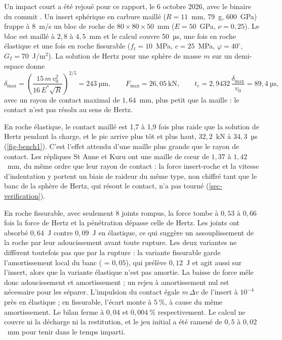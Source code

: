 Un impact court a été rejoué pour ce rapport, le 6 octobre 2026, avec le binaire du commit . Un insert sphérique en carbure maillé ($R = 11$~mm, 79~g, 600~GPa) frappe à 8~m/s un bloc de roche de $80 \times 80 \times 50$~mm ($E = 50$~GPa, $\nu = 0{,}25$). Le bloc est maillé à $2{,}8$ à $4{,}5$~mm et le calcul couvre 50~µs, une fois en roche élastique et une fois en roche fissurable ($f_t = 10$~MPa, $c = 25$~MPa, $\varphi = 40^\circ$, $G_I = 70$~J/m$^2$). La solution de Hertz pour une sphère de masse $m$ sur un demi-espace donne
\begin{equation}
\delta_\text{max} = \left(\frac{15\,m\,v_0^2}{16\,E^*\sqrt R}\right)^{2/5} = 243~\text{µm}, \qquad F_\text{max} = 26{,}05~\text{kN}, \qquad t_c = 2{,}9432\,\frac{\delta_\text{max}}{v_0} = 89{,}4~\text{µs},
\end{equation}
avec un rayon de contact maximal de $1{,}64$~mm, plus petit que la maille : le contact n'est pas résolu au sens de Hertz.

En roche élastique, le contact maillé est 1,7 à 1,9 fois plus raide que la solution de Hertz pendant la charge, et le pic arrive plus tôt et plus haut, $32{,}2$~kN à $34{,}3$~µs (\cref{fig-bench1}). C'est l'effet attendu d'une maille plus grande que le rayon de contact. Les répliques St Anne et Kuru ont une maille de cœur de $1{,}37$ à $1{,}42$~mm, du même ordre que leur rayon de contact : la force insert-roche et la vitesse d'indentation y portent un biais de raideur du même type, non chiffré tant que le banc de la sphère de Hertz, qui résout le contact, n'a pas tourné (\cref{sec-verification}).

En roche fissurable, avec seulement 8 joints rompus, la force tombe à $0{,}53$ à $0{,}66$ fois la force de Hertz et la pénétration dépasse celle de Hertz. Les joints ont absorbé $0{,}64$~J contre $0{,}09$~J en élastique, ce qui suggère un assouplissement de la roche par leur adoucissement avant toute rupture. Les deux variantes ne diffèrent toutefois pas que par la rupture : la variante fissurable garde l'amortissement local du banc ( = $0{,}05$), qui prélève $0{,}12$~J et agit aussi sur l'insert, alors que la variante élastique n'est pas amortie. La baisse de force mêle donc adoucissement et amortissement ; un rejeu à amortissement nul est nécessaire pour les séparer. L'impulsion du contact égale $m\,\Delta v$ de l'insert à $10^{-4}$ près en élastique ; en fissurable, l'écart monte à $5~\%$, à cause du même amortissement. Le bilan ferme à $0{,}04$ et $0{,}004~\%$ respectivement. Le calcul ne couvre ni la décharge ni la restitution, et le jeu initial a été ramené de $0{,}5$ à $0{,}02$~mm pour tenir dans le temps imparti.

